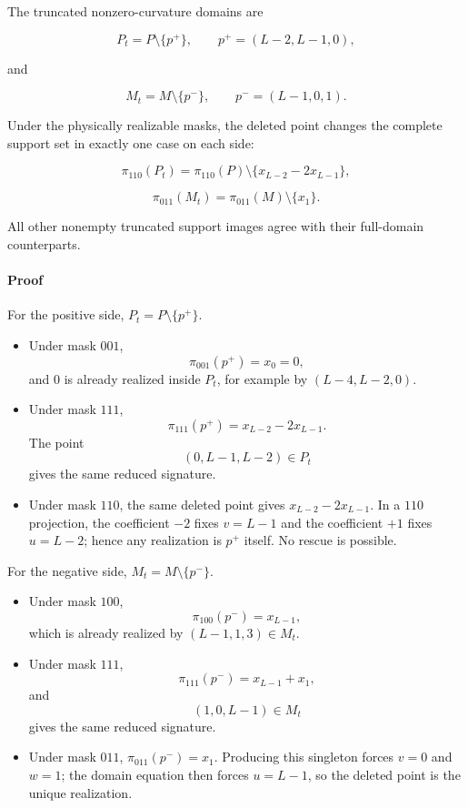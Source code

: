 \documentclass[
  british,
  a4paper,
  11pt]{article}
\newcounter{none} %
\begin{document}
The truncated nonzero-curvature domains are

\[
P_t=P\setminus\{p^+\},
\qquad
p^+=(L-2,L-1,0),
\tag{4.3}
\]

and

\[
M_t=M\setminus\{p^-\},
\qquad
p^-=(L-1,0,1).
\tag{4.4}
\]

Under the physically realizable masks, the deleted point changes the
complete support set in exactly one case on each side:

\[
\pi_{110}(P_t)
=
\pi_{110}(P)
\setminus
\{x_{L-2}-2x_{L-1}\},
\tag{4.5}
\]

\[
\pi_{011}(M_t)
=
\pi_{011}(M)
\setminus
\{x_1\}.
\tag{4.6}
\]

All other nonempty truncated support images agree with their full-domain
counterparts.

\paragraph{Proof}\label{proof-3}

For the positive side, \(P_t=P\setminus\{p^+\}\).

\begin{itemize}
\item
  Under mask \(001\), \[
  \pi_{001}(p^+)=x_0=0,
  \] and \(0\) is already realized inside \(P_t\), for example by
  \((L-4,L-2,0)\).
\item
  Under mask \(111\), \[
  \pi_{111}(p^+)=x_{L-2}-2x_{L-1}.
  \] The point \[
  (0,L-1,L-2)\in P_t
  \] gives the same reduced signature.
\item
  Under mask \(110\), the same deleted point gives \(x_{L-2}-2x_{L-1}\).
  In a \(110\) projection, the coefficient \(-2\) fixes \(v=L-1\) and
  the coefficient \(+1\) fixes \(u=L-2\); hence any realization is
  \(p^+\) itself. No rescue is possible.
\end{itemize}

For the negative side, \(M_t=M\setminus\{p^-\}\).

\begin{itemize}
\item
  Under mask \(100\), \[
  \pi_{100}(p^-)=x_{L-1},
  \] which is already realized by \((L-1,1,3)\in M_t\).
\item
  Under mask \(111\), \[
  \pi_{111}(p^-)=x_{L-1}+x_1,
  \] and \[
  (1,0,L-1)\in M_t
  \] gives the same reduced signature.
\item
  Under mask \(011\), \(\pi_{011}(p^-)=x_1\). Producing this singleton
  forces \(v=0\) and \(w=1\); the domain equation then forces \(u=L-1\),
  so the deleted point is the unique realization.
\end{itemize}
\end{document}
